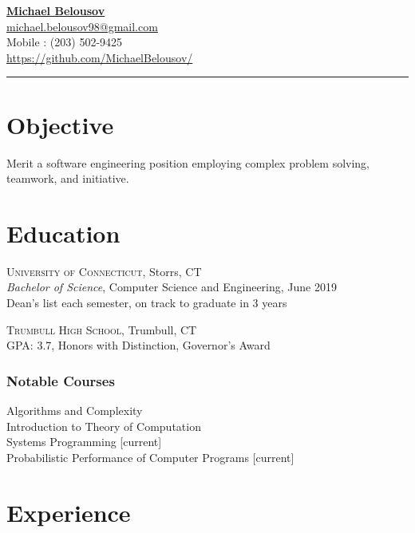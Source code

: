 \documentclass[Letterpaper,11pt]{article}
\begin{document}
\setlength{\parindent}{0em}
\setlength{\parskip}{1em}
\setlength{\parsep}{1em}
\setlength{\itemsep}{0.2em}
\setlength{\headsep}{0.2em}
\setlength{\topskip}{0.2em}
\setlength{\topmargin}{0.2em}
\setlength{\topsep}{0.2em}
\setlength{\partopsep}{0.2em}
\setlength{\columnsep}{1em}

\addtolength{\topmargin}{-2em}

\textbf{\href{mailto:michael.belousov98@gmail.com}{\Large Michael Belousov}}\\ 
\href{mailto:michael.belousov98@gmail.com}{michael.belousov98@gmail.com}\\  
Mobile : (203) 502-9425\\
\href{https://github.com/MichaelBelousov/}{https://github.com/MichaelBelousov/}\\  
\hrule

\section*{Objective}

Merit a software engineering position employing complex problem solving, teamwork, and initiative.

\section*{Education}
    
    \textsc{University of Connecticut}, Storrs, CT\\
    \textit{Bachelor of Science}, Computer Science and Engineering, June 2019\\
    Dean's list each semester, on track to graduate in 3 years

    \textsc{Trumbull High School}, Trumbull, CT\\
    GPA: 3.7, Honors with Distinction, Governor's Award

    \subsubsection*{Notable Courses}
    Algorithms and Complexity\\
    Introduction to Theory of Computation\\
    Systems Programming [current]\\
    Probabilistic Performance of Computer Programs [current]

\section*{Experience}
\end{document}
